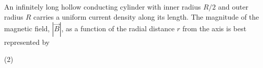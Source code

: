 
\item An infinitely long hollow conducting cylinder with inner radius \(R/2\) and outer radius \(R\) carries a uniform current density along its length. The magnitude of the magnetic field, \(|\vec{B}|\), as a function of the radial distance \(r\) from the axis is best represented by
\begin{tasks}(2)
    \task 
    \begin{center}
    \end{center}
    \task
    \begin{center}
    \end{center}
    \task
    \begin{center}
    \end{center}
    \task
    \begin{center}
    \end{center}
\end{tasks}
